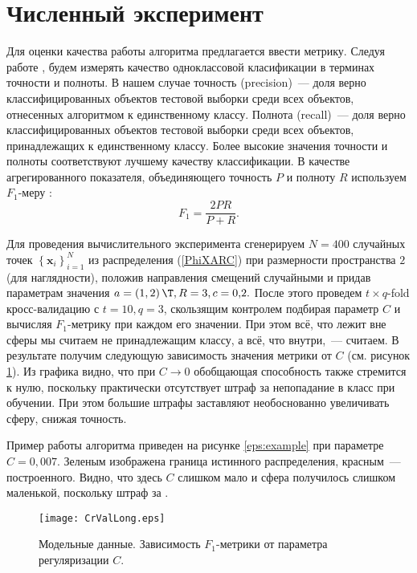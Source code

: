 \documentclass[12pt]{article}
\newcommand\mb[1]{\ensuremath{\boldsymbol{\mathbf{#1}}}}
\newcommand\cbr[1]{\left(#1\right)} %
\newcommand\fbr[1]{\left\{#1\right\}} %
\begin{document}
\section{Численный эксперимент} 		 	
	Для оценки качества работы алгоритма предлагается ввести метрику. 
	Следуя работе  \cite{Romanenko2012}, будем измерять качество одноклассовой класификации в терминах точности и полноты. 
	В нашем случае точность (precision)~--- доля верно классифицированных объектов тестовой выборки среди всех объектов, отнесенных алгоритмом к единственному классу. 
	Полнота (recall)~--- доля верно классифицированных объектов тестовой выборки среди всех объектов, принадлежащих к единственному классу. 
	Более высокие значения точности и полноты соответствуют лучшему качеству классификации. 
	В качестве агрегированного показателя, объединяющего точность $P$ и полноту $R$ используем $F_1$-меру \cite{Rijsbergen1979}:
	$$F_1 = \frac{2PR}{P+R}.$$

	Для проведения вычислительного эксперимента сгенерируем $N=400$ случайных точек $\fbr{\mb x_i}_{i=1}^N$ из распределения (\ref{PhiXARC}) при размерности пространства $2$ (для наглядности), положив направления смещений случайными и придав параметрам значения $a = \cbr{1,2}\T, R = 3, c = 0{,}2.$
	После этого проведем $t{\times}q$-fold кросс-валидацию с $t = 10, q = 3$, скользящим контролем подбирая параметр $C$ и вычисляя $F_1$-метрику при каждом его значении. При этом всё, что лежит вне сферы мы считаем не принадлежащим классу, а всё, что внутри,~--- считаем.
	В результате получим следующую зависимость значения метрики от $C$ (см. рисунок \ref{eps:CrValLong}).
	Из графика видно, что при $C\to 0$ обобщающая способность также стремится к нулю, поскольку практически отсутствует штраф за непопадание в класс при обучении. 
	При этом большие штрафы заставляют необоснованно увеличивать сферу, снижая точность.

	Пример работы алгоритма приведен на рисунке \ref{eps:example} при параметре $C = 0{,}007.$ 
	Зеленым изображена граница истинного распределения, красным~--- построенного.
	Видно, что здесь $C$ слишком мало и сфера получилось слишком маленькой, поскольку штраф за .
	
	\begin{figure}[!ht] %
		\centering
		\texttt{[image: CrValLong.eps]} %
		\vspace{-5pt}
		\caption{Модельные данные. Зависимость $F_1$-метрики от параметра регуляризации $C$.}
		\label{eps:CrValLong}
	\end{figure}
\end{document}
